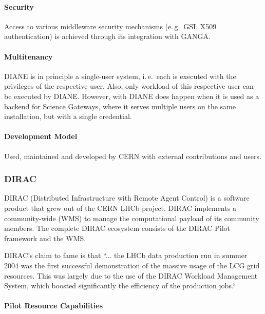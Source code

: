 \documentclass{sig-alternate}
\begin{document}
\paragraph{Security}
Access to various middleware security mechanisms (e.\,g.\ GSI, X509
authentication) is achieved through its integration with GANGA.

\paragraph{Multitenancy}
DIANE is in principle a single-user \pilot system, i.\,e.\ each \pilot is
executed with the privileges of the respective user.
Also, only workload of this respective user can be executed by DIANE.
However,  with DIANE does happen when it is used as a
backend for Science Gateways, where it serves multiple users on the same
installation, but with a single credential.

\paragraph{Development Model}
Used, maintained and developed by CERN with external contributions and users.

%
%
\subsubsection{DIRAC}
\label{sec:dirac}

DIRAC (Distributed Infrastructure with Remote Agent Control) is a software
product that grew out of the CERN LHCb project\cite{diracgrid2004}.
DIRAC implements a community-wide (WMS) to
manage the computational payload of its community members.
The complete DIRAC ecosystem consists of the DIRAC Pilot framework and the WMS.

DIRAC's claim to fame is that ``... the LHCb data production run in summer 2004
was the first successful demonstration of the massive usage of the LCG grid
resources. This was largely due to the use of the DIRAC Workload Management
System, which boosted significantly the efficiency of the production
jobs.``~\cite{Tsaregorodtsev:2010cj}

\paragraph{Pilot Resource Capabilities}
\end{document}
